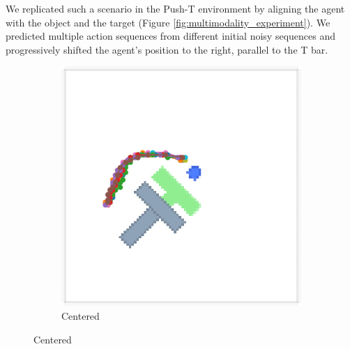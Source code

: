We replicated such a scenario in the Push-T environment by aligning the agent with the object and the target
(Figure \ref{fig:multimodality_experiment}). We predicted multiple action sequences from different initial
noisy sequences and progressively shifted the agent's position to the right, parallel to the T bar.
\begin{figure}[!htb]
    \centering
    \begin{subfigure}[b]{0.4\linewidth}
        \centering
        \includegraphics[width=\linewidth]{figures/multimodality_centered.png}
        \caption{Centered}
    \end{subfigure}


\end{figure}
